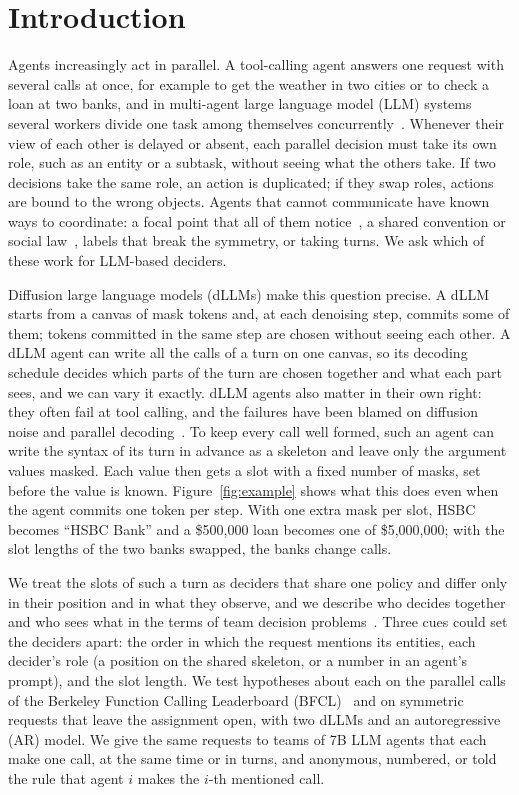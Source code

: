 \section{Introduction}
\label{sec:intro}

Agents increasingly act in parallel. A tool-calling agent answers one request with several calls at once, for example to get the weather in two cities or to check a loan at two banks, and in multi-agent large language model (LLM) systems several workers divide one task among themselves concurrently~\cite{mao2026delm,rodionov2025hogwild}. Whenever their view of each other is delayed or absent, each parallel decision must take its own role, such as an entity or a subtask, without seeing what the others take. If two decisions take the same role, an action is duplicated; if they swap roles, actions are bound to the wrong objects. Agents that cannot communicate have known ways to coordinate: a focal point that all of them notice~\cite{schelling1960strategy,fenster1995coordination}, a shared convention or social law~\cite{lewis1969convention,shoham1995social}, labels that break the symmetry, or taking turns. We ask which of these work for LLM-based deciders.

Diffusion large language models (dLLMs) make this question precise. A dLLM starts from a canvas of mask tokens and, at each denoising step, commits some of them; tokens committed in the same step are chosen without seeing each other. A dLLM agent can write all the calls of a turn on one canvas, so its decoding schedule decides which parts of the turn are chosen together and what each part sees, and we can vary it exactly. dLLM agents also matter in their own right: they often fail at tool calling, and the failures have been blamed on diffusion noise and parallel decoding~\cite{lu2026bitter}. To keep every call well formed, such an agent can write the syntax of its turn in advance as a skeleton and leave only the argument values masked. Each value then gets a slot with a fixed number of masks, set before the value is known. Figure~\ref{fig:example} shows what this does even when the agent commits one token per step. With one extra mask per slot, HSBC becomes ``HSBC Bank'' and a \$500{,}000 loan becomes one of \$5{,}000{,}000; with the slot lengths of the two banks swapped, the banks change calls.

We treat the slots of such a turn as deciders that share one policy and differ only in their position and in what they observe, and we describe who decides together and who sees what in the terms of team decision problems~\cite{radner1962team}. Three cues could set the deciders apart: the order in which the request mentions its entities, each decider's role (a position on the shared skeleton, or a number in an agent's prompt), and the slot length. We test hypotheses about each on the parallel calls of the Berkeley Function Calling Leaderboard (BFCL)~\cite{patil2025bfcl} and on symmetric requests that leave the assignment open, with two dLLMs and an autoregressive (AR) model. We give the same requests to teams of 7B LLM agents that each make one call, at the same time or in turns, and anonymous, numbered, or told the rule that agent $i$ makes the $i$-th mentioned call.

